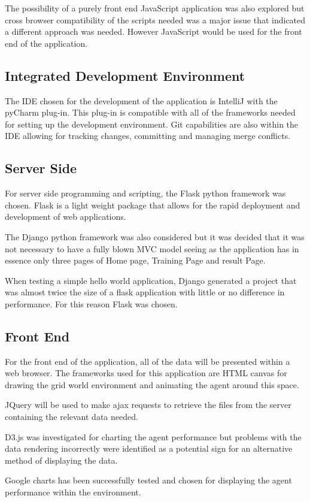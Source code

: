 The possibility of a purely front end JavaScript application was also explored but cross browser compatibility of the scripts needed was a major issue that indicated a different approach was needed. However JavaScript would be used for the front end of the application.

\subsection{Integrated Development Environment}
The IDE chosen for the development of the application is IntelliJ with the pyCharm plug-in. This plug-in is compatible with all of the frameworks needed for setting up the development environment. Git capabilities are also within the IDE allowing for tracking changes, committing and managing merge conflicts.  
\subsection{Server Side}
For server side programming and scripting, the Flask python framework was chosen. Flask is a light weight package that allows for the rapid deployment and development of web applications.

The Django python framework was also considered but it was decided that it was not necessary to have a fully blown MVC model seeing as the application has in essence only three pages of Home page, Training Page and result Page.

When testing a simple hello world application, Django generated a project that was almost twice the size of a flask application with little or no difference in performance.
For this reason Flask was chosen. 
\subsection{Front End}
For the front end of the application, all of the data will be presented within a web browser. The frameworks used for this application are HTML canvas for drawing the grid world environment and animating the agent around this space.

JQuery will be used to make ajax requests to retrieve the files from the server containing the relevant data needed.

D3.js was investigated for charting the agent performance but problems with the data rendering incorrectly were identified as a potential sign for an alternative method of displaying the data.

Google charts has been successfully tested and chosen for displaying the agent performance within the environment.

